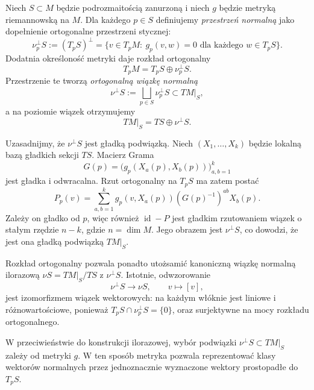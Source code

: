 \begin{uwaga}
Niech $S\subset M$ będzie podrozmaitością zanurzoną i niech
$g$ będzie metryką riemannowską na $M$. Dla każdego $p\in S$
definiujemy \emph{przestrzeń normalną} jako dopełnienie
ortogonalne przestrzeni stycznej:
\[
\nu_p^\perp S:=(T_pS)^\perp
=\{v\in T_pM:\ g_p(v,w)=0
\text{ dla każdego }w\in T_pS\}.
\]
Dodatnia określoność metryki daje rozkład ortogonalny
\[
T_pM=T_pS\oplus\nu_p^\perp S.
\]
Przestrzenie te tworzą \emph{ortogonalną wiązkę normalną}
\[
\nu^\perp S:=\bigsqcup_{p\in S}\nu_p^\perp S
\subset TM|_S,
\]
a na poziomie wiązek otrzymujemy
\[
TM|_S=TS\oplus\nu^\perp S.
\]

Uzasadnijmy, że $\nu^\perp S$ jest gładką podwiązką.
Niech $(X_1,\ldots,X_k)$ będzie lokalną bazą gładkich
sekcji $TS$. Macierz Grama
\[
G(p)=\bigl(g_p(X_a(p),X_b(p))\bigr)_{a,b=1}^k
\]
jest gładka i odwracalna. Rzut ortogonalny na $T_pS$
ma zatem postać
\[
P_p(v)=
\sum_{a,b=1}^k
g_p(v,X_a(p))(G(p)^{-1})^{ab}X_b(p).
\]
Zależy on gładko od $p$, więc również
$\operatorname{id}-P$ jest gładkim rzutowaniem
wiązek o stałym rzędzie $n-k$, gdzie $n=\dim M$.
Jego obrazem jest $\nu^\perp S$, co dowodzi,
że jest ona gładką podwiązką $TM|_S$.

Rozkład ortogonalny pozwala ponadto utożsamić
kanoniczną wiązkę normalną ilorazową
$\nu S=TM|_S/TS$ z $\nu^\perp S$.
Istotnie, odwzorowanie
\[
\nu^\perp S\longrightarrow\nu S,
\qquad
v\longmapsto[v],
\]
jest izomorfizmem wiązek wektorowych: na każdym
włóknie jest liniowe i różnowartościowe, ponieważ
$T_pS\cap\nu_p^\perp S=\{0\}$, oraz surjektywne
na mocy rozkładu ortogonalnego.

W przeciwieństwie do konstrukcji ilorazowej,
wybór podwiązki $\nu^\perp S\subset TM|_S$
zależy od metryki $g$. W ten sposób metryka
pozwala reprezentować klasy wektorów normalnych
przez jednoznacznie wyznaczone wektory prostopadłe
do $T_pS$.
\end{uwaga}


